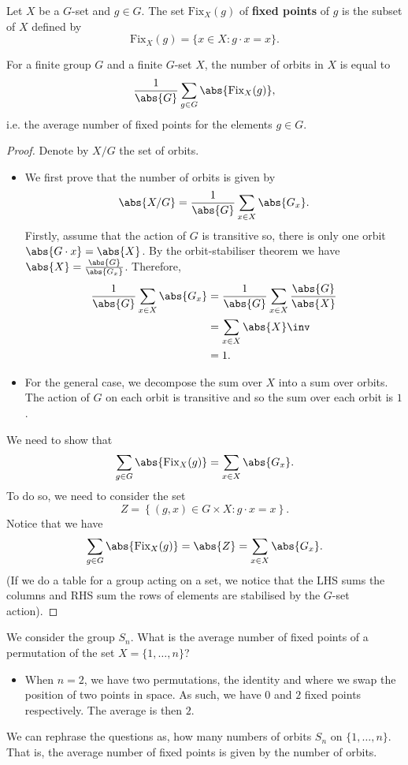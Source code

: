 \documentclass[12pt, a4paper]{article}
\begin{document}
\begin{definition}
    Let \(X\) be a \(G\)-set and \(g \in G\). The set \(\text{Fix}_X(g)\) of \textbf{fixed points} of \(g\) is the subset of \(X\) defined by 
    \[\text{Fix}_X(g)= \{x\in X :g\cdot x =x\}.\]
\end{definition}

\begin{mdprop}
    For a finite group \(G\) and a finite \(G\)-set \(X\), the number of orbits in \(X\) is equal to 
    \[\frac{1}{\abs{G}}\sum_{g\in G} \abs{\text{Fix}_X(g)},\]
    i.e. the average number of fixed points for the elements \(g\in G\).
\end{mdprop}

\begin{proof}
    Denote by \(X/G\) the set of orbits. 
    \begin{itemize}
        \item We first prove that the number of orbits is given by 
        \[\abs{X/G} = \frac{1}{\abs{G}}\sum_{x\in X} \abs{G_x}.\]
        Firstly, assume that the action of \(G\) is transitive so, there is only one orbit \(\abs{G\cdot x}=\abs{X}\). By the orbit-stabiliser theorem we have \(\abs{X} = \frac{\abs{G}}{\abs{G_x}}\). Therefore, 
        \[\begin{aligned}
        \frac{1}{\abs{G}}\sum_{x\in X} \abs{G_x} &= \frac{1}{\abs{G}}\sum_{x\in X} \frac{\abs{G}}{\abs{X}} \\
        &= \sum_{x\in X}\abs{X}\inv \\
        &=1.
        \end{aligned}\]
        \item For the general case, we decompose the sum over \(X\) into a sum over orbits. The action of \(G\) on each orbit is transitive and so the sum over each orbit is \(1\). 
    \end{itemize}
    We need to show that 
    \[\sum_{g\in G} \abs{\text{Fix}_X(g)} = \sum_{x\in X} \abs{G_x}.\]
    To do so, we need to consider the set 
    \[Z = \left\{ (g,x) \in G \times X : g\cdot x=x \right\}.\]
    Notice that we have 
    \[\sum_{g\in G} \abs{\text{Fix}_X(g)} =\abs{Z}= \sum_{x\in X} \abs{G_x}.\]
    (If we do a table for a group acting on a set, we notice that the LHS sums the columns and RHS sum the rows of elements are stabilised by the \(G\)-set action).
\end{proof}

\begin{mdexample}
    We consider the group \(S_n\). What is the average number of fixed points of a permutation of the set \(X=\{1,\ldots,n\}\)?
    \begin{itemize}
        \item When \(n=2\), we have two permutations, the identity and where we swap the position of two points in space. As such, we have \(0\) and \(2\) fixed points respectively. The average is then \(2\). 
    \end{itemize}
    We can rephrase the questions as, how many numbers of orbits \(S_n\) on \(\{1,\ldots,n\}\). That is, the average number of fixed points is given by the number of orbits.
\end{mdexample}
\end{document}
